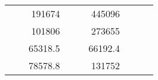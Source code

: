 \begin{table}[]
\begin{tabular}{|ccrccrccc}
\multicolumn{1}{|c|}{\cellcolor[HTML]{FFFFC7}}                                & \multicolumn{1}{c|}{\cellcolor[HTML]{DDFDFF}}                      & \multicolumn{1}{r|}{\cellcolor[HTML]{DAE8FC}191674}    & \multicolumn{1}{c|}{\cellcolor[HTML]{FFFFC7}}                                & \multicolumn{1}{c|}{\cellcolor[HTML]{DDFDFF}}                       & \multicolumn{1}{r|}{\cellcolor[HTML]{DDFDFF}445096}    &                                                                              &                                                                    &                                                        \\ \cline{3-3} \cline{6-6}
\multicolumn{1}{|c|}{\cellcolor[HTML]{FFFFC7}}                                & \multicolumn{1}{c|}{\cellcolor[HTML]{DDFDFF}}                      & \multicolumn{1}{r|}{\cellcolor[HTML]{DDFDFF}101806}    & \multicolumn{1}{c|}{\cellcolor[HTML]{FFFFC7}}                                & \multicolumn{1}{c|}{\cellcolor[HTML]{DDFDFF}}                       & \multicolumn{1}{r|}{\cellcolor[HTML]{DAE8FC}273655}    &                                                                              &                                                                    &                                                        \\ \cline{3-3} \cline{6-6}
\multicolumn{1}{|c|}{\cellcolor[HTML]{FFFFC7}}                                & \multicolumn{1}{c|}{\cellcolor[HTML]{DDFDFF}}                      & \multicolumn{1}{r|}{\cellcolor[HTML]{DAE8FC}65318.5}   & \multicolumn{1}{c|}{\cellcolor[HTML]{FFFFC7}}                                & \multicolumn{1}{c|}{\cellcolor[HTML]{DDFDFF}}                       & \multicolumn{1}{r|}{\cellcolor[HTML]{DDFDFF}66192.4}   &                                                                              &                                                                    &                                                        \\ \cline{3-3} \cline{6-6}
\multicolumn{1}{|c|}{\cellcolor[HTML]{FFFFC7}}                                & \multicolumn{1}{c|}{\cellcolor[HTML]{DDFDFF}}                      & \multicolumn{1}{r|}{\cellcolor[HTML]{DDFDFF}78578.8}   & \multicolumn{1}{c|}{\cellcolor[HTML]{FFFFC7}}                                & \multicolumn{1}{c|}{\cellcolor[HTML]{DDFDFF}}                       & \multicolumn{1}{r|}{\cellcolor[HTML]{DAE8FC}131752}    &                                                                              &                                                                    &                                                        \\ \cline{3-3} \cline{6-6}

\end{tabular}
\end{table}
